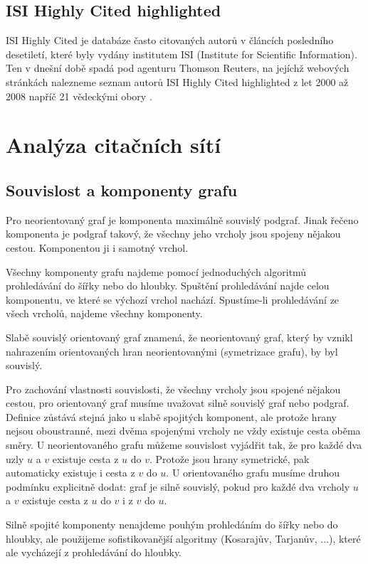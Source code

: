\documentclass[12pt,titlepage]{report}
\begin{document}
\subsection{ISI Highly Cited highlighted}
ISI Highly Cited je databáze často citovaných autorů v článcích posledního
desetiletí, které byly vydány institutem ISI (Institute for Scientific
Information). Ten v dnešní době spadá pod agenturu Thomson Reuters, na jejíchž
webových stránkách nalezneme seznam autorů ISI Highly Cited highlighted z let
2000 až 2008 napříč 21 vědeckými obory \cite{highlycited}.

\section{Analýza citačních sítí}
\subsection{Souvislost a komponenty grafu}
Pro neorientovaný graf je komponenta maximálně souvislý podgraf. Jinak řečeno
komponenta je podgraf takový, že všechny jeho vrcholy jsou spojeny nějakou
cestou. Komponentou ji i samotný vrchol.

Všechny komponenty grafu najdeme pomocí jednoduchých algoritmů prohledávání do
šířky nebo do hloubky. Spuštění prohledávání najde celou komponentu, ve které
se výchozí vrchol nachází. Spustíme-li prohledávání ze všech vrcholů, najdeme
všechny komponenty. 

Slabě souvislý orientovaný graf znamená, že neorientovaný graf, který by vznikl
nahrazením orientovaných hran neorientovanými (symetrizace grafu), by byl
souvislý.

Pro zachování vlastnosti souvislosti, že všechny vrcholy jsou spojené nějakou
cestou, pro orientovaný graf musíme uvažovat silně souvislý graf nebo podgraf.
Definice zůstává stejná jako u slabě spojitých komponent, ale protože hrany
nejsou oboustranné, mezi dvěma spojenými vrcholy ne vždy existuje cesta oběma
směry. U neorientovaného grafu můžeme souvislost vyjádřit tak, že pro každé dva
uzly $u$ a $v$ existuje cesta z $u$ do $v$. Protože jsou hrany symetrické, pak
automaticky existuje i cesta z $v$ do $u$. U orientovaného grafu musíme druhou
podmínku explicitně dodat: graf je silně souvislý, pokud pro každé dva vrcholy
$u$ a $v$ existuje cesta z $u$ do $v$ i z $v$ do $u$. 

Silně spojité komponenty nenajdeme pouhým prohledáním do šířky nebo do hloubky,
ale použijeme sofistikovanější algoritmy (Kosarajův, Tarjanův, ...), které ale
vycházejí z prohledávání do hloubky.
\end{document}
